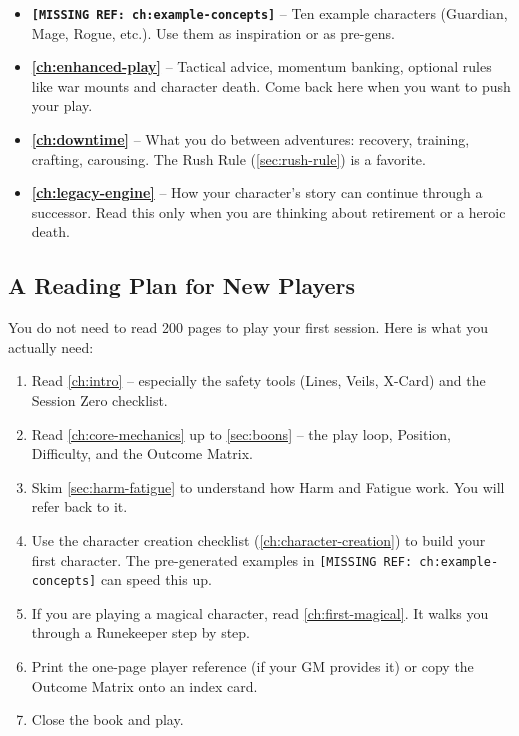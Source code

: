 \begin{itemize}
    \item \textbf{\texttt{[MISSING REF: ch:example-concepts]}} -- Ten example characters (Guardian, Mage, Rogue, etc.). Use them as inspiration or as pre-gens.
    \item \textbf{\autoref{ch:enhanced-play}} -- Tactical advice, momentum banking, optional rules like war mounts and character death. Come back here when you want to push your play.
    \item \textbf{\autoref{ch:downtime}} -- What you do between adventures: recovery, training, crafting, carousing. The Rush Rule (\autoref{sec:rush-rule}) is a favorite.
    \item \textbf{\autoref{ch:legacy-engine}} -- How your character's story can continue through a successor. Read this only when you are thinking about retirement or a heroic death.
\end{itemize}

\subsection*{A Reading Plan for New Players}

You do not need to read 200 pages to play your first session. Here is what you actually need:

\begin{enumerate}
    \item Read \autoref{ch:intro} -- especially the safety tools (Lines, Veils, X-Card) and the Session Zero checklist.
    \item Read \autoref{ch:core-mechanics} up to \autoref{sec:boons} -- the play loop, Position, Difficulty, and the Outcome Matrix.
    \item Skim \autoref{sec:harm-fatigue} to understand how Harm and Fatigue work. You will refer back to it.
    \item Use the character creation checklist (\autoref{ch:character-creation}) to build your first character. The pre-generated examples in \texttt{[MISSING REF: ch:example-concepts]} can speed this up.
    \item If you are playing a magical character, read \autoref{ch:first-magical}. It walks you through a Runekeeper step by step.
    \item Print the one-page player reference (if your GM provides it) or copy the Outcome Matrix onto an index card.
    \item Close the book and play.
\end{enumerate}

